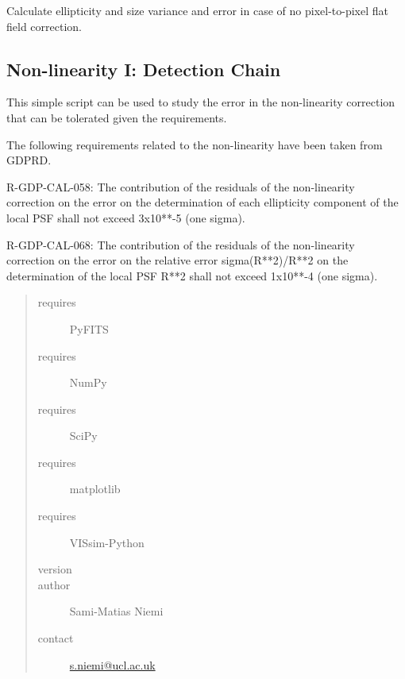 \documentclass[a4paper,11pt,english]{sphinxmanual}
\begin{document}

\begin{fulllineitems}
\label{reduction:analysis.FlatfieldCalibration.testNoFlatfieldingEffects}
Calculate ellipticity and size variance and error in case of no pixel-to-pixel flat field correction.

\end{fulllineitems}

\label{reduction:module-analysis.nonlinearityCalibration}

\subsection{Non-linearity I: Detection Chain}
\label{reduction:non-linearity-i-detection-chain}
This simple script can be used to study the error in the non-linearity correction that can be tolerated given the
requirements.

The following requirements related to the non-linearity have been taken from GDPRD.

R-GDP-CAL-058: The contribution of the residuals of the non-linearity correction on the error on the determination
of each ellipticity component of the local PSF shall not exceed 3x10**-5 (one sigma).

R-GDP-CAL-068: The contribution of the residuals of the non-linearity correction on the error on the relative
error sigma(R**2)/R**2 on the determination of the local PSF R**2 shall not exceed 1x10**-4 (one sigma).
\begin{quote}\begin{description}
\item[{requires}] \leavevmode
PyFITS

\item[{requires}] \leavevmode
NumPy

\item[{requires}] \leavevmode
SciPy

\item[{requires}] \leavevmode
matplotlib

\item[{requires}] \leavevmode
VISsim-Python

\item[{version}] 

\item[{author}] \leavevmode
Sami-Matias Niemi

\item[{contact}] \leavevmode
\href{mailto:s.niemi@ucl.ac.uk}{s.niemi@ucl.ac.uk}

\end{description}\end{quote}
\end{document}
